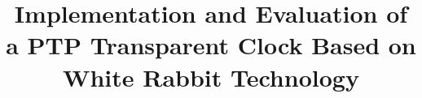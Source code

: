 \documentclass[conference]{IEEEtran}
\begin{document}
\title{Implementation and Evaluation of a PTP Transparent Clock Based on White Rabbit
Technology}


\maketitle



















\end{document}
